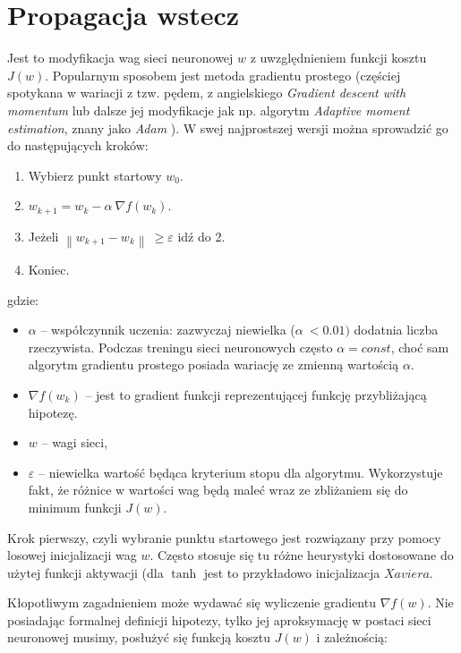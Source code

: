 \section{Propagacja wstecz}
\label{sec:backprob}

Jest to modyfikacja wag sieci neuronowej \(w\) z uwzględnieniem funkcji kosztu \(J(w)\). Popularnym sposobem jest metoda gradientu prostego \cite{gd} (częściej spotykana w wariacji z tzw. pędem, z angielskiego \textit{Gradient descent with momentum} lub dalsze jej modyfikacje jak np. algorytm
\textit{Adaptive moment estimation}, znany jako \textit{Adam} \cite{adampaper}). W swej najprostszej wersji można sprowadzić go do następujących kroków:

\begin{enumerate}
\def\labelenumi{\arabic{enumi}.}
\item
  Wybierz punkt startowy \(w_{0}\).
\item
  \(w_{k + 1} = w_{k} - \alpha\ \nabla f(w_{k})\).
\item
  Jeżeli \(\left\| w_{k + 1} - w_{k} \right\|\  \geq \varepsilon\) idź
  do 2.
\item
  Koniec.
\end{enumerate}

gdzie:

\begin{itemize}
\item
  \(\alpha\) -- współczynnik uczenia: zazwyczaj niewielka
  (\(\alpha\  < 0.01)\) dodatnia liczba rzeczywista. Podczas treningu
  sieci neuronowych często \(\alpha = const\), choć sam algorytm
  gradientu prostego posiada wariację ze zmienną wartością \(\alpha\).
\item
  \(\nabla f(w_{k})\) -- jest to gradient funkcji reprezentującej
  funkcję przybliżającą hipotezę.
\item
  \(w\) -- wagi sieci,
\item
  \(\varepsilon\) -- niewielka wartość będąca kryterium stopu dla
  algorytmu. Wykorzystuje fakt, że różnice w wartości wag będą maleć
  wraz ze zbliżaniem się do minimum funkcji \(J(w)\).
\end{itemize}

Krok pierwszy, czyli wybranie punktu startowego jest rozwiązany przy pomocy losowej inicjalizacji wag \(w\). Często stosuje się tu różne heurystyki dostosowane do użytej funkcji aktywacji (dla \(\tanh\) jest to przykładowo inicjalizacja \(Xaviera\).

Kłopotliwym zagadnieniem może wydawać się wyliczenie gradientu \(\nabla f(w)\). Nie posiadając formalnej definicji hipotezy, tylko jej aproksymację w postaci sieci neuronowej musimy, posłużyć się funkcją kosztu \(J(w)\) i zależnością:

